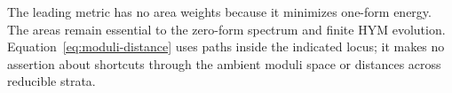 The leading metric has no area weights
because it minimizes one-form energy.
The areas remain essential to the
zero-form spectrum and finite HYM
evolution. Equation~\eqref{eq:moduli-distance}
uses paths inside the indicated
locus; it makes no assertion about
shortcuts through the ambient
moduli space or distances across
reducible strata.
